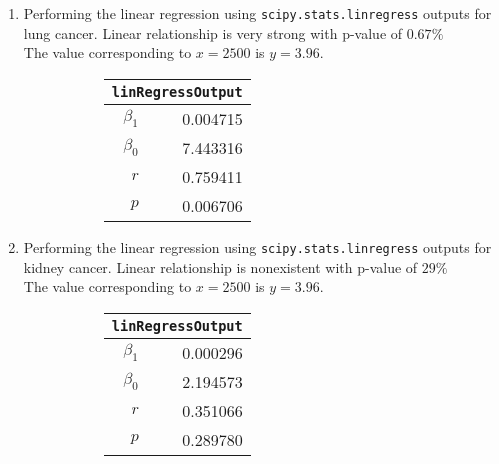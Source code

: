 \begin{enumerate}
\item Performing the linear regression using \texttt{scipy.stats.linregress} outputs for lung cancer.
Linear relationship is very strong with p-value of $ 0.67\% $\\
The value corresponding to $ x = 2500 $ is $ y = 3.96 $.

\begin{figure}[H]
	\begin{subfigure}[]{0.2\linewidth}
		\centering
		\begin{tabular}{@{}rr@{}}
			\toprule
			\multicolumn{2}{c}{\texttt{linRegressOutput}} \\
			\midrule
			$\beta_1$     &         0.004715 \\
			$\beta_0$ &         7.443316 \\
			$r$    &         0.759411 \\
			$p$    &         0.006706 \\
			\bottomrule
		\end{tabular}
		
	\end{subfigure}
	\begin{subfigure}[]{0.8\linewidth}
		\centering
		
	\end{subfigure}
\end{figure}

\item Performing the linear regression using \texttt{scipy.stats.linregress} outputs for kidney cancer.
Linear relationship is nonexistent with p-value of $ 29\% $\\
The value corresponding to $ x = 2500 $ is $ y = 3.96 $.

\begin{figure}[H]
	\begin{subfigure}[]{0.2\linewidth}
		\centering
		\begin{tabular}{@{}rr@{}}
			\toprule
			\multicolumn{2}{c}{\texttt{linRegressOutput}} \\
			\midrule
			$\beta_1$     &         0.000296 \\
			$\beta_0$ &         2.194573 \\
			$r$    &         0.351066 \\
			$p$    &         0.289780 \\
			\bottomrule
		\end{tabular}
		

\end{subfigure}
\end{figure}
\end{enumerate}
